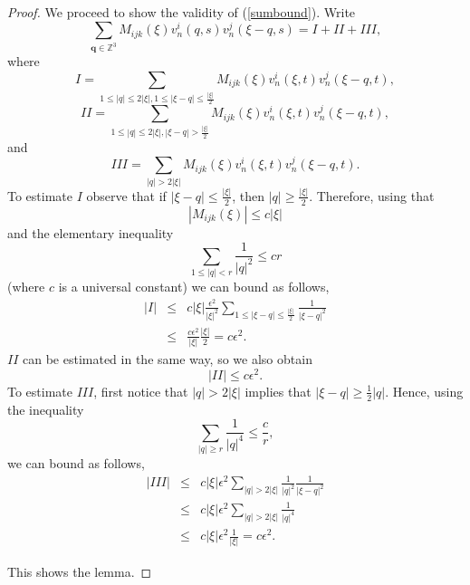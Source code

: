 \documentclass{amsart}
\begin{document}
\begin{proof}
We proceed to show the validity of (\ref{sumbound}). Write
\[
\sum_{\mathbf{q}\in\mathbb{Z}^3}
M_{ijk}\left(\xi\right)v_n^i\left(q,s\right)v_n^j\left(\xi-q,s\right)= I+II+III,
\]
where
\[
I=\sum_{1\leq\left|q\right|\leq 2\left|\xi\right|,1\leq\left|\xi-q\right|\leq \frac{\left|\xi\right|}{2}}
M_{ijk}\left(\xi\right)v_n^i\left(\xi,t\right)v_n^j\left(\xi-q,t\right),
\]
\[
II=\sum_{1\leq\left|q\right|\leq 2\left|\xi\right|,\left|\xi-q\right|>\frac{\left|\xi\right|}{2}}
M_{ijk}\left(\xi\right)v_n^i\left(\xi,t\right)v_n^j\left(\xi-q,t\right),
\]
and
\[
III=\sum_{\left|q\right|>2\left|\xi\right|}
M_{ijk}\left(\xi\right)v_n^i\left(\xi,t\right)v_n^j\left(\xi-q,t\right).
\]
To estimate $I$ observe that if $\left|\xi-q\right|\leq \frac{\left|\xi\right|}{2}$, then 
$\left|q\right|\geq\frac{\left|\xi\right|}{2}$. Therefore, using that
\[
\left|M_{ijk}\left(\xi\right)\right|\leq c\left|\xi\right|
\]
and the elementary inequality
\begin{equation}
\label{basicineq0}
\sum_{1\leq\left|q\right|<r}\frac{1}{\left|q\right|^2}\leq cr
\end{equation}
(where $c$ is a universal constant) we can bound as follows,
\begin{eqnarray*}
\left|I\right|&\leq& c\left|\xi\right|\frac{\epsilon^2}{\left|\xi\right|^2}
\sum_{1\leq\left|\xi-q\right|\leq \frac{\left|\xi\right|}{2}}\frac{1}{\left|\xi-q\right|^2}\\
&\leq& \frac{c\epsilon^2}{\left|\xi\right|}\frac{\left|\xi\right|}{2}=c\epsilon^2.
\end{eqnarray*}
$II$ can be estimated in the same way, so we also obtain
\[
\left|II\right|\leq c\epsilon^2.
\]
To estimate $III$, first notice that $\left|q\right|>2\left|\xi\right|$ implies that
$\left|\xi-q\right|\geq \frac{1}{2}\left|q\right|$. Hence, using the inequality
\begin{equation}
\label{basicineq}
\sum_{\left|q\right|\geq r}\frac{1}{\left|q\right|^4}\leq \frac{c}{r},
\end{equation}
we can bound as follows,
\begin{eqnarray*}
\left|III\right|&\leq& c\left|\xi\right|\epsilon^2\sum_{\left|q\right|>2\left|\xi\right|}
\frac{1}{\left|q\right|^2}\frac{1}{\left|\xi-q\right|^2}\\
&\leq&c\left|\xi\right|\epsilon^2\sum_{\left|q\right|>2\left|\xi\right|}\frac{1}{\left|q\right|^4}\\
&\leq& c\left|\xi\right|\epsilon^2\frac{1}{\left|\xi\right|}=c\epsilon^2.
\end{eqnarray*}

This shows the lemma.
\end{proof}
\end{document}
